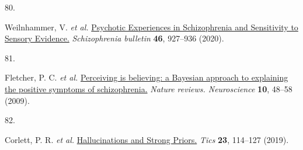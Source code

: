 \documentclass[
]{article}
\newlength{\cslhangindent}
\newlength{\csllabelwidth}
\newlength{\cslentryspacingunit} %
\newenvironment{CSLReferences}[2] %
 {%
  \setlength{\parindent}{0pt}
  \ifodd #1
  \let\oldpar\par
  \def\par{\hangindent=\cslhangindent\oldpar}
  \fi
  \setlength{\parskip}{#2\cslentryspacingunit}
 }%
 {}
\newcommand{\CSLLeftMargin}[1]{\parbox[t]{\csllabelwidth}{#1}}
\newcommand{\CSLRightInline}[1]{\parbox[t]{\linewidth - \csllabelwidth}{#1}\break}
\begin{document}
\begin{CSLReferences}{0}{0}
\leavevmode{}%
\CSLLeftMargin{80. }%
\CSLRightInline{Weilnhammer, V. \emph{et al.}
\href{https://www.ncbi.nlm.nih.gov/pubmed/32090246}{{Psychotic
Experiences in Schizophrenia and Sensitivity to Sensory Evidence.}}
\emph{Schizophrenia bulletin} \textbf{46}, 927--936 (2020).}

\leavevmode{}%
\CSLLeftMargin{81. }%
\CSLRightInline{Fletcher, P. C. \emph{et al.}
\href{https://doi.org/10.1038/nrn2536}{{Perceiving is believing: a
Bayesian approach to explaining the positive symptoms of
schizophrenia.}} \emph{Nature reviews. Neuroscience} \textbf{10}, 48--58
(2009).}

\leavevmode{}%
\CSLLeftMargin{82. }%
\CSLRightInline{Corlett, P. R. \emph{et al.}
\href{https://doi.org/10.1016/j.tics.2018.12.001}{{Hallucinations and
Strong Priors.}} \emph{Tics} \textbf{23}, 114--127 (2019).}

\end{CSLReferences}
\end{document}
